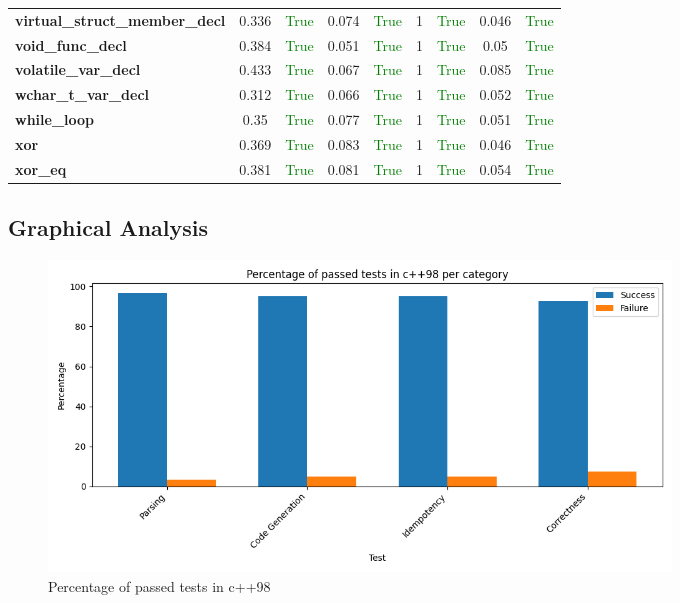 \documentclass{article}
\begin{document}
\begin{xltabular}{\textwidth}{lcccccccc}
\textbf{{\fontsize{10}{12}\selectfont virtual\_struct\_member\_decl}}& 0.336&\textcolor{green}{True}& 0.074&\textcolor{green}{True}& 1&\textcolor{green}{True}& 0.046&\textcolor{green}{True} \\[0.5ex]
\textbf{{\fontsize{10}{12}\selectfont void\_func\_decl}}& 0.384&\textcolor{green}{True}& 0.051&\textcolor{green}{True}& 1&\textcolor{green}{True}& 0.05&\textcolor{green}{True} \\[0.5ex]
\textbf{{\fontsize{10}{12}\selectfont volatile\_var\_decl}}& 0.433&\textcolor{green}{True}& 0.067&\textcolor{green}{True}& 1&\textcolor{green}{True}& 0.085&\textcolor{green}{True} \\[0.5ex]
\textbf{{\fontsize{10}{12}\selectfont wchar\_t\_var\_decl}}& 0.312&\textcolor{green}{True}& 0.066&\textcolor{green}{True}& 1&\textcolor{green}{True}& 0.052&\textcolor{green}{True} \\[0.5ex]
\textbf{{\fontsize{10}{12}\selectfont while\_loop}}& 0.35&\textcolor{green}{True}& 0.077&\textcolor{green}{True}& 1&\textcolor{green}{True}& 0.051&\textcolor{green}{True} \\[0.5ex]
\textbf{{\fontsize{10}{12}\selectfont xor}}& 0.369&\textcolor{green}{True}& 0.083&\textcolor{green}{True}& 1&\textcolor{green}{True}& 0.046&\textcolor{green}{True} \\[0.5ex]
\textbf{{\fontsize{10}{12}\selectfont xor\_eq}}& 0.381&\textcolor{green}{True}& 0.081&\textcolor{green}{True}& 1&\textcolor{green}{True}& 0.054&\textcolor{green}{True} \\[0.5ex]
\bottomrule
\end{xltabular}
\newpage
\subsection{Graphical Analysis}
\begin{figure}[h!]
\centering
\includegraphics[width=0.8\textwidth]{../reports/clava/images/c++98_percentage.png}
\caption{Percentage of passed tests in c++98}
\label{fig:c++98_percentage}
\end{figure}
\newpage
\end{document}

